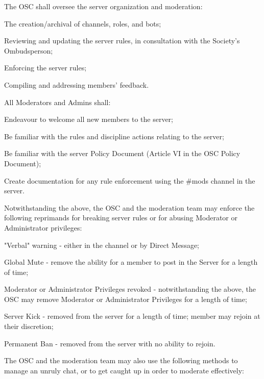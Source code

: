 \begin{longenum}[ label*=\thesubsection.\arabic*., align=left]
\begin{longenum}[label*=\arabic*., align=left]
\begin{longenum}[label*=\arabic*., align=left]
		\end{longenum}
	\end{longenum}
\item The OSC shall oversee the server organization and moderation:
	\begin{longenum}[label*=\arabic*., align=left]
	\item The creation/archival of channels, roles, and bots;
	\item Reviewing and updating the server rules, in consultation with the Society's Ombudsperson;
	\item Enforcing the server rules;
	\item Compiling and addressing members' feedback.
	\end{longenum}
\item All Moderators and Admins shall:
	\begin{longenum}[label*=\arabic*., align=left]
	\item Endeavour to welcome all new members to the server;
	\item Be familiar with the rules and discipline actions relating to the server;
	\item Be familiar with the server Policy Document (Article VI in the OSC Policy Document);
	\item Create documentation for any rule enforcement using the \#mods channel in the server.
	\end{longenum}
\item Notwithstanding the above, the OSC and the moderation team may enforce the following reprimands for breaking server rules or for abusing Moderator or Administrator privileges:
	\begin{longenum}[label*=\arabic*., align=left]
	\item "Verbal" warning - either in the channel or by Direct Message; 
	\item Global Mute - remove the ability for a member to post in the Server for a length of time;
	\item Moderator or Administrator Privileges revoked - notwithstanding the above, the OSC may remove Moderator or Administrator Privileges for a length of time;
	\item Server Kick - removed from the server for a length of time; member may rejoin at their discretion;
	\item Permanent Ban - removed from the server with no ability to rejoin.
	\end{longenum}
\item The OSC and the moderation team may also use the following methods to manage an unruly chat, or to get caught up in order to moderate effectively:

\end{longenum}
